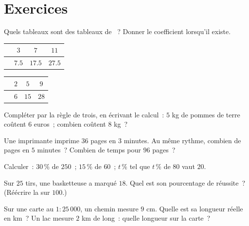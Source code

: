 \section{Exercices}

\begin{exercise}[$\star$]\label{exo:g7:prop:1}
Quels tableaux sont des tableaux de ~? Donner le
coefficient lorsqu'il existe.
\begin{center}
\renewcommand{\arraystretch}{1.2}
\begin{tabular}{l|ccc}
 & $3$ & $7$ & $11$ \\
\hline
 & $7.5$ & $17.5$ & $27.5$ \\
\end{tabular}
\qquad
\begin{tabular}{l|ccc}
 & $2$ & $5$ & $9$ \\
\hline
 & $6$ & $15$ & $28$ \\
\end{tabular}
\end{center}
\end{exercise}

\begin{exercise}[$\star$]\label{exo:g7:prop:2}
Compléter par la règle de trois, en écrivant le calcul~: $5$ kg de
pommes de terre coûtent $6$ euros~; combien coûtent $8$ kg~?
\end{exercise}

\begin{exercise}[$\star$]\label{exo:g7:prop:3}
Une imprimante imprime $36$ pages en $3$ minutes. Au même rythme,
combien de pages en $5$ minutes~? Combien de temps pour $96$ pages~?
\end{exercise}

\begin{exercise}[$\star$]\label{exo:g7:prop:4}
Calculer~: $30\,\%$ de $250$~; \quad $15\,\%$ de $60$~; \quad
$t\,\%$ tel que $t\,\%$ de $80$ vaut $20$.
\end{exercise}

\begin{exercise}[$\star$]\label{exo:g7:prop:5}
Sur $25$ tirs, une basketteuse a marqué $18$. Quel est son
pourcentage de réussite~? (Réécrire la  sur $100$.)
\end{exercise}

\begin{exercise}[$\star$]\label{exo:g7:prop:6}
Sur une carte au $1 : 25\,000$, un chemin mesure $9$ cm. Quelle est
sa longueur réelle en km~? Un lac mesure $2$ km de long~: quelle
longueur sur la carte~?
\end{exercise}

